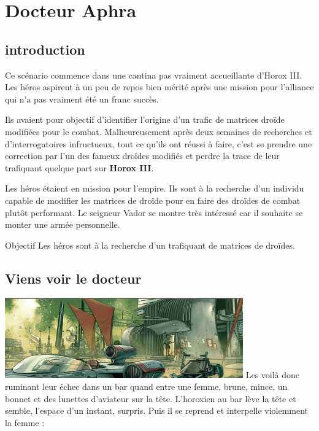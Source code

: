 \section{Docteur Aphra}

\subsection{introduction}
Ce scénario commence dans une cantina pas vraiment accueillante d’Horox III. Les héros aspirent à un peu de repos bien mérité après une mission pour l’alliance qui n’a pas vraiment été un franc succès.

\lettrine{\jedifont{\$}} Ils avaient pour objectif d’identifier l’origine d’un trafic de matrices droïde modifiées pour le combat. Malheureusement après deux semaines de recherches et d’interrogatoires infructueux, tout ce qu’ils ont réussi à faire, c’est se prendre une correction par l’un des fameux droïdes modifiés et perdre la trace de leur trafiquant quelque part sur \textbf{Horox III}.

\lettrine{\jedifont{\#}} Les héros étaient en mission pour l’empire. Ils sont à la recherche d’un individu capable de modifier les matrices de droïde pour en faire des droïdes de combat plutôt performant. Le seigneur Vador se montre très intéressé car il souhaite se monter une armée personnelle.

\begin{paperbox}{Objectif}
Les héros sont à la recherche d’un trafiquant de matrices de droïdes.
\end{paperbox}

\subsection{Viens voir le docteur}
\noindent\includegraphics[width=\linewidth]{_img/places/cantina-horox-iii.jpg}
Les voilà donc ruminant leur échec dans un bar quand entre une femme, brune, mince, un bonnet et des lunettes d’aviateur sur la tête. L’horoxien au bar lève la tête et semble, l’espace d’un instant, surpris. Puis il se reprend et interpelle violemment la femme :

